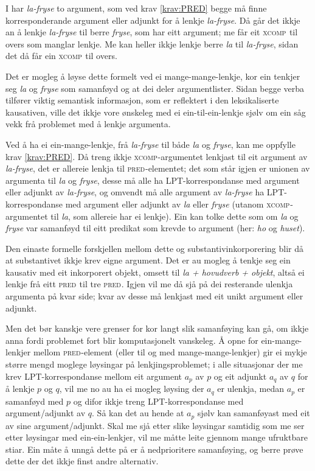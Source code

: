 \documentclass[11pt,a4paper,oneside,draft]{book}
\newcommand{\F}[2]{\textsc{#1}\ensuremath{_{#2}}}
\newcommand{\XCOMP}{\F{xcomp}{}}
\newcommand{\PRED}{\F{pred}{}}
\begin{document}
I \Last har \emph{la-fryse} to argument, som ved krav \ref{krav:PRED} begge
må finne korresponderande argument eller adjunkt for å lenkje \emph{la-fryse}. 
Då går det ikkje an å lenkje \emph{la-fryse} til berre \emph{fryse},
som har eitt argument; me får eit \XCOMP{} til overs som manglar
lenkje. Me kan heller ikkje lenkje berre \emph{la} til \emph{la-fryse}, sidan
det då får ein \XCOMP{} til overs.

Det er mogleg å løyse dette formelt ved ei mange-mange-lenkje, kor ein
tenkjer seg \emph{la} og \emph{fryse} som samanføyd og at dei deler
argumentlister. Sidan begge verba tilfører viktig semantisk
informasjon, som er reflektert i den leksikaliserte kausativen, ville
det ikkje vore ønskeleg med ei ein-til-ein-lenkje sjølv om ein såg
vekk frå problemet med å lenkje argumenta.

Ved å ha ei ein-mange-lenkje, frå \emph{la-fryse} til både \emph{la} og \emph{fryse},
kan me oppfylle krav \ref{krav:PRED}. Då treng ikkje
\XCOMP{}-argumentet lenkjast til eit argument av \emph{la-fryse}, det er
allereie lenkja til \PRED{}-elementet; det som står igjen er unionen av
argumenta til \emph{la} og \emph{fryse}, desse må alle ha LPT-korrespondanse med
argument eller adjunkt av \emph{la-fryse}, og omvendt må alle argument av \emph{la-fryse} 
ha LPT-korrespondanse med argument eller adjunkt av \emph{la}
eller \emph{fryse} (utanom \XCOMP{}-argumentet til \emph{la}, som allereie har ei
lenkje). Ein kan tolke dette som om \emph{la} og \emph{fryse} var samanføyd til
eitt predikat som krevde to argument (her: \emph{ho} og \emph{huset}).

Den einaste formelle forskjellen mellom dette og
substantivinkorporering blir då at substantivet ikkje krev eigne
argument. Det er au mogleg å tenkje seg ein kausativ med eit
inkorporert objekt, omsett til \emph{la + hovudverb + objekt}, altså ei
lenkje frå eitt \PRED{} til tre \PRED{}. Igjen vil me då sjå på dei resterande
ulenkja argumenta på kvar side; kvar av desse må lenkjast med eit
unikt argument eller adjunkt.

Men det bør kanskje vere grenser for kor langt slik samanføying kan
gå, om ikkje anna fordi problemet fort blir komputasjonelt
vanskeleg. Å opne for ein-mange-lenkjer mellom \PRED{}-element (eller til
og med mange-mange-lenkjer) gir ei mykje større mengd moglege
løysingar på lenkjingsproblemet; i alle situasjonar der me krev
LPT-korrespondanse mellom eit argument $a_p$ av $p$ og eit adjunkt
$a_q$ av $q$ for å lenkje $p$ og $q$, vil me no au ha ei mogleg
løysing der $a_q$ er ulenkja, medan $a_p$ er samanføyd med $p$ og
difor ikkje treng LPT-korrespondanse med argument/adjunkt av $q$. Så
kan det au hende at $a_p$ sjølv kan samanføyast med eit av sine
argument/adjunkt. Skal me sjå etter slike løysingar samtidig som me
ser etter løysingar med ein-ein-lenkjer, vil me måtte leite gjennom
mange ufruktbare stiar. Ein måte å unngå dette på er å nedprioritere
samanføying, og berre prøve dette der det ikkje finst andre
alternativ.
\end{document}
